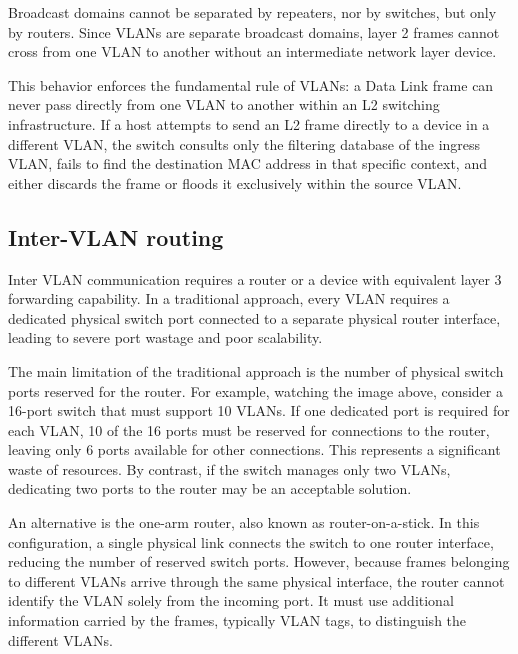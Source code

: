 Broadcast domains cannot be separated by repeaters, nor by switches, but only by routers. Since VLANs are separate broadcast domains, layer 2 frames cannot cross from one VLAN to another without an intermediate network layer device.

This behavior enforces the fundamental rule of VLANs: a Data Link frame can never pass directly from one VLAN to another within an L2 switching infrastructure. If a host attempts to send an L2 frame directly to a device in a different VLAN, the switch consults only the filtering database of the ingress VLAN, fails to find the destination MAC address in that specific context, and either discards the frame or floods it exclusively within the source VLAN.

\subsection{Inter-VLAN routing}
Inter VLAN communication requires a router or a device with equivalent layer 3 forwarding capability. In a traditional approach, every VLAN requires a dedicated physical switch port connected to a separate physical router interface, leading to severe port wastage and poor scalability.


\begin{center}
\end{center}

The main limitation of the traditional approach is the number of physical switch ports reserved for the router. For example, watching the image above, consider a 16-port switch that must support 10 VLANs. If one dedicated port is required for each VLAN, 10 of the 16 ports must be reserved for connections to the router, leaving only 6 ports available for other connections. This represents a significant waste of resources. By contrast, if the switch manages only two VLANs, dedicating two ports to the router may be an acceptable solution.

An alternative is the one-arm router, also known as router-on-a-stick. In this configuration, a single physical link connects the switch to one router interface, reducing the number of reserved switch ports. However, because frames belonging to different VLANs arrive through the same physical interface, the router cannot identify the VLAN solely from the incoming port. It must use additional information carried by the frames, typically VLAN tags, to distinguish the different VLANs.

